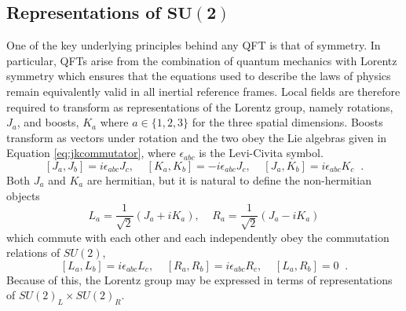  \subsection[Representations of $SU(2)$]
{Representations of $\mathbf{SU(2)}$}

 One of the key underlying principles behind any QFT
  is that of symmetry. 
 In particular, QFTs arise from the combination
  of quantum mechanics with Lorentz symmetry
  which ensures that the equations
  used to describe the laws of physics remain equivalently
  valid in all inertial reference frames.
 Local fields are therefore required to transform as 
  representations of the Lorentz group, namely
  rotations, $J_a$, and boosts, $K_a$ where
  $a\in\{1,2,3\}$ for the three spatial dimensions.
 Boosts transform as vectors under rotation and 
  the two obey the Lie algebras given in 
  Equation \ref{eq:jkcommutator}, where $\epsilon_{abc}$
  is the Levi-Civita symbol.
\begin{equation} \label{eq:jkcommutator}
 [J_a,J_b]=i\epsilon_{abc}J_c,  \;\;\;\; 
 [K_a,K_b]=-i\epsilon_{abc}J_c, \;\;\;\; 
 [J_a,K_b]=i\epsilon_{abc}K_c \;\; .
\end{equation}
 Both $J_a$ and $K_a$ are hermitian,
  but it is natural to define the non-hermitian objects
\begin{equation} \label{eq:LRdefs}
 L_a = \frac{1}{\sqrt{2}}\left(J_a+iK_a\right), \;\;\;\;
 R_a = \frac{1}{\sqrt{2}}\left(J_a-iK_a\right)
\end{equation}
 which commute with each other and each independently
  obey the commutation relations of $SU(2)$,
\begin{equation}\label{eq:LRcomm}
 [L_a,L_b]=i\epsilon_{abc}L_c,  \;\;\;\; 
 [R_a,R_b]=i\epsilon_{abc}R_c, \;\;\;\; 
 [L_a,R_b]=0 \;\; .
\end{equation}
 Because of this, %
  the Lorentz group may be expressed in terms 
  of representations of $SU(2)_L\times SU(2)_R$.
 
